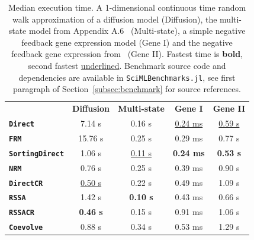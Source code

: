 \documentclass{juliacon}
\numberwithin{equation}{section}
\begin{document}
\begin{table}
\centering
\begin{tabular}{lcccc}
\toprule
                                 & \textbf{Diffusion} & \textbf{Multi-state} & \textbf{Gene I}     & \textbf{Gene II}   \\
\cmidrule{1-5}
\textbf{\texttt{Direct}}         & 7.14 s             & 0.16 s               & \underline{0.24 ms} & \underline{0.59 s} \\
\textbf{\texttt{FRM}}            & 15.76 s            & 0.25 s               & 0.29 ms             & 0.77 s             \\
\textbf{\texttt{SortingDirect}}  & 1.06 s             & \underline{0.11 s}   & \textbf{0.24 ms}    & \textbf{0.53 s}    \\
\textbf{\texttt{NRM}}            & 0.76 s             & 0.25 s               & 0.39 ms             & 0.90 s             \\
\textbf{\texttt{DirectCR}}       & \underline{0.50 s} & 0.22 s               & 0.49 ms             & 1.09 s             \\
\textbf{\texttt{RSSA}}           & 1.42 s             & \textbf{0.10 s}      & 0.43 ms             & 0.66 s             \\
\textbf{\texttt{RSSACR}}         & \textbf{0.46 s}    & 0.15 s               & 0.91 ms             & 1.06 s             \\
\textbf{\texttt{Coevolve}}       & 0.88 s             & 0.34 s               & 0.53 ms             & 1.29 s             \\
\bottomrule
\end{tabular}
\caption{Median execution time. A 1-dimensional continuous time random walk approximation of a diffusion model (Diffusion), the multi-state model from Appendix A.6~\cite{marchetti2017} (Multi-state), a simple negative feedback gene expression model (Gene I) and the negative feedback gene expression from~\cite{gupta2018} (Gene II). Fastest time is \textbf{bold}, second fastest \underline{underlined}. Benchmark source code and dependencies are available in \texttt{SciMLBenchmarks.jl}, see first paragraph of Section~\ref{subsec:benchmark} for source references.}
\label{tab:benchmark-biochemistry}
\end{table}
\end{document}
